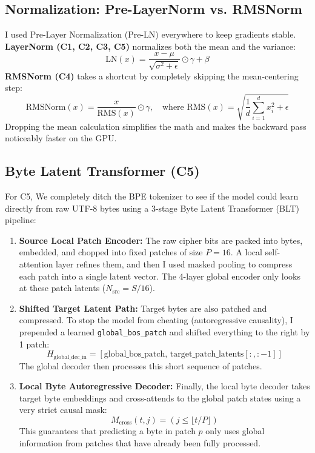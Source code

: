 \documentclass[12pt,a4paper]{article}
\begin{document}
\subsection{Normalization: Pre-LayerNorm vs. RMSNorm}
I used Pre-Layer Normalization (Pre-LN) everywhere to keep gradients stable. 
\textbf{LayerNorm (C1, C2, C3, C5)} normalizes both the mean and the variance:
\begin{equation}
\text{LN}(x) = \frac{x - \mu}{\sqrt{\sigma^2 + \epsilon}} \odot \gamma + \beta
\end{equation}
\textbf{RMSNorm (C4)} takes a shortcut by completely skipping the mean-centering step:
\begin{equation}
\text{RMSNorm}(x) = \frac{x}{\text{RMS}(x)} \odot \gamma, \quad \text{where } \text{RMS}(x) = \sqrt{\frac{1}{d} \sum_{i=1}^d x_i^2 + \epsilon}
\end{equation}
Dropping the mean calculation simplifies the math and makes the backward pass noticeably faster on the GPU.

\subsection{Byte Latent Transformer (C5)}
For C5, We completely ditch the BPE tokenizer to see if the model could learn directly from raw UTF-8 bytes using a 3-stage Byte Latent Transformer (BLT) pipeline:
\begin{enumerate}
    \item \textbf{Source Local Patch Encoder:} The raw cipher bits are packed into bytes, embedded, and chopped into fixed patches of size $P=16$. A local self-attention layer refines them, and then I used masked pooling to compress each patch into a single latent vector. The 4-layer global encoder only looks at these patch latents ($N_{\text{src}} = S / 16$).
    \item \textbf{Shifted Target Latent Path:} Target bytes are also patched and compressed. To stop the model from cheating (autoregressive causality), I prepended a learned \texttt{global\_bos\_patch} and shifted everything to the right by 1 patch:
    \begin{equation}
    H_{\text{global\_dec\_in}} = [\text{global\_bos\_patch}, \, \text{target\_patch\_latents}[:, :-1]]
    \end{equation}
    The global decoder then processes this short sequence of patches.
    \item \textbf{Local Byte Autoregressive Decoder:} Finally, the local byte decoder takes target byte embeddings and cross-attends to the global patch states using a very strict causal mask:
    \begin{equation}
    M_{\text{cross}}(t, j) = \left(j \le \lfloor t / P \rfloor\right)
    \end{equation}
    This guarantees that predicting a byte in patch $p$ only uses global information from patches that have already been fully processed. 
\end{enumerate}
\end{document}
